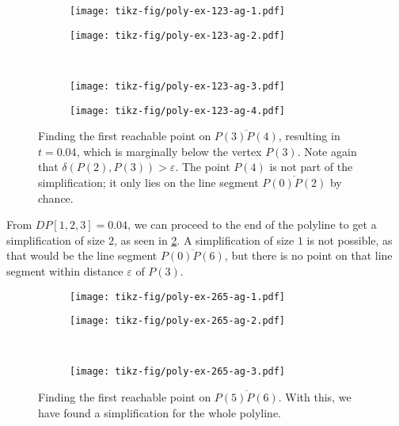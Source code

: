 \begin{figure}
  \centering
  \begin{subfigure}[b]{0.4\textwidth}
    \texttt{[image: tikz-fig/poly-ex-123-ag-1.pdf]}
  \end{subfigure}
  \begin{subfigure}[b]{0.4\textwidth}
    \texttt{[image: tikz-fig/poly-ex-123-ag-2.pdf]}
  \end{subfigure}\\
  \begin{subfigure}[b]{0.4\textwidth}
    \texttt{[image: tikz-fig/poly-ex-123-ag-3.pdf]}
  \end{subfigure}
  \begin{subfigure}[b]{0.4\textwidth}
    \texttt{[image: tikz-fig/poly-ex-123-ag-4.pdf]}
  \end{subfigure}
  \caption{Finding the first reachable point on \(\overline{P(3)P(4)}\), resulting in \(t = 0.04\), which is marginally below the vertex \(P(3)\). Note again that \(\delta(P(2), P(3)) > \varepsilon\). The point \(P(4)\) is not part of the simplification; it only lies on the line segment \(\overline{P(0)P(2)}\) by chance.}
  \label{fig:poly-ex-123-ag}
\end{figure}

From \(DP[1,2,3] = 0.04\), we can proceed to the end of the polyline to get a simplification of size \(2\), as seen in \cref{fig:poly-ex-265-ag}. A simplification of size \(1\) is not possible, as that would be the line segment \(\overline{P(0)P(6)}\), but there is no point on that line segment within distance \(\varepsilon\) of \(P(3)\).

\begin{figure}
  \centering
  \begin{subfigure}[b]{0.4\textwidth}
    \texttt{[image: tikz-fig/poly-ex-265-ag-1.pdf]}
  \end{subfigure}
  \begin{subfigure}[b]{0.4\textwidth}
    \texttt{[image: tikz-fig/poly-ex-265-ag-2.pdf]}
  \end{subfigure}\\
  \begin{subfigure}[b]{0.4\textwidth}
    \texttt{[image: tikz-fig/poly-ex-265-ag-3.pdf]}
  \end{subfigure}
  \caption{Finding the first reachable point on \(\overline{P(5)P(6)}\). With this, we have found a simplification for the whole polyline.}
  \label{fig:poly-ex-265-ag}
\end{figure}

